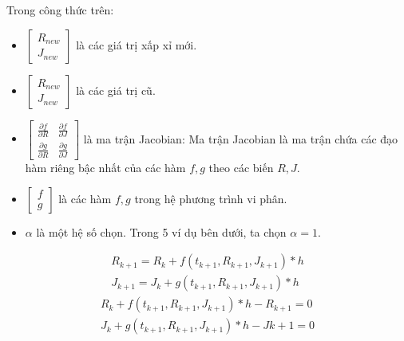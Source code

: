 Trong công thức trên:
\begin{itemize}
    \item $\begin{bmatrix}
    R_{new} \\
    J_{new}
    \end{bmatrix}$ là các giá trị xấp xỉ mới.
    \item $\begin{bmatrix}
    R_{new} \\
    J_{new}
    \end{bmatrix}$ là các giá trị cũ.
    \item $\begin{bmatrix}
    \frac{\partial f}{\partial R} & \frac{\partial f}{\partial J}\\
    \frac{\partial g}{\partial R} & \frac{\partial g}{\partial J}
    \end{bmatrix}$ là ma trận Jacobian: Ma trận Jacobian là ma trận chứa các đạo hàm riêng bậc nhất của các hàm $f, g$ theo các biến $R, J$.
    \item $\begin{bmatrix}
    f \\
    g
    \end{bmatrix}$ là các hàm $f, g$ trong hệ phương trình vi phân.
    \item $\alpha$ là một hệ số chọn. Trong 5 ví dụ bên dưới, ta chọn $\alpha = 1$. 
\end{itemize}
\hspace*{0.5cm}{Giá trị đầu vào cho công thức hồi quy phải ở dạng phương trình Euler ẩn, với các biến, các hàm được định nghĩa như phía dưới:}
\begin{align*}
    R_{k+1} = R_k + f(t_{k+1}, R_{k+1}, J_{k+1}) * h\\
    J_{k+1} = J_k + g(t_{k+1}, R_{k+1}, J_{k+1}) * h
\end{align*}
\hspace*{0.5cm}{Ta đưa hai phương trình trên về dạng sau để áp dụng giải thuật Newton - Raphson:}
\begin{align*}
    R_k + f(t_{k+1}, R_{k+1}, J_{k+1}) * h - R_{k+1} = 0\\
    J_k + g(t_{k+1}, R_{k+1}, J_{k+1}) * h - J{k+1} = 0
\end{align*}
